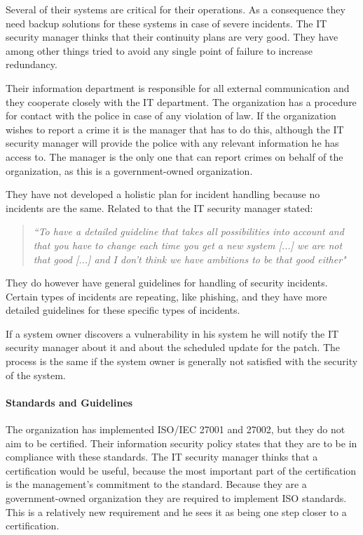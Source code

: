 Several of their systems are critical for their operations. As a consequence they need backup solutions for these systems in case of severe incidents. The IT security manager thinks that their continuity plans are very good. They have among other things tried to avoid any single point of failure to increase redundancy.

Their information department is responsible for all external communication and they cooperate closely with the IT department. The organization has a procedure for contact with the police in case of any violation of law. If the organization wishes to report a crime it is the manager that has to do this, although the IT security manager will provide the police with any relevant information he has access to. The manager is the only one that can report crimes on behalf of the organization, as this is a government-owned organization.

They have not developed a holistic plan for incident handling because no incidents are the same. Related to that the IT security manager stated:

\begin{quote}
\textit{``To have a detailed guideline that takes all possibilities into account and that you have to change each time you get a new system %
[...] we are not that good [...] and I don't think we have ambitions to be that good either"}
\end{quote}

They do however have general guidelines for handling of security incidents. Certain types of incidents are repeating, like phishing, and they have more detailed guidelines for these specific types of incidents.

If a system owner discovers a vulnerability in his system he will notify the IT security manager about it and about the scheduled update for the patch. The process is the same if the system owner is generally not satisfied with the security of the system.

\paragraph{Standards and Guidelines}
The organization has implemented \acs{ISO}/\acs{IEC} 27001 and 27002, but they do not aim to be certified. Their information security policy states that they are to be in compliance with these standards. The IT security manager thinks that a certification would be useful, because the most important part of the certification is the management's commitment to the standard. Because they are a government-owned organization they are required to implement \acs{ISO} standards. This is a relatively new requirement and he sees it as being one step closer to a certification.

